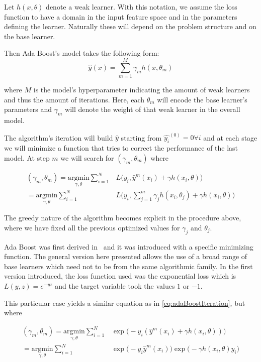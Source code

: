 Let $h(x,\theta)$ denote a weak learner.
With this notation, we assume the loss function to have a domain in the input feature space and in the parameters defining the learner.
Naturally these will depend on the problem structure and on the base learner.

Then Ada Boost's model takes the following form:
\begin{equation}\label{eq:adaBoostModel}
\hat{y}(x) = \sum_{m=1}^{M} \gamma_m h(x,\theta_m)
\end{equation}

where $M$ is the model's hyperparameter indicating the amount of weak learners and thus the amount of iterations.
Here, each $\theta_m$ will encode the base learner's parameters and $\gamma_m$ will denote the weight of that weak learner in the overall model.

The algorithm's iteration will build $\hat{y}$ starting from $\hat{y_i}^{(0)}= 0 \forall i$ and at each stage we will minimize a function that tries to correct the performance of the last model.
At step $m$ we will search for $(\gamma_{m}, \theta_{m})$ where

\begin{equation}\label{eq:adaBoostIteration}
\begin{split}
(\gamma_{m}, \theta_{m}) = \underset{\gamma, \theta}{\mathrm{argmin}} \sum_{i=1}^{N} & L\big( y_i,  \hat{y}^{m}(x_i) + \gamma h(x_i,\theta) \big) \\
= \underset{\gamma, \theta}{\mathrm{argmin}} \sum_{i=1}^{N} & L\big( y_i,  \sum_{j=1}^{m} \gamma_j h(x_i,\theta_j) + \gamma h(x_i,\theta) \big)
\end{split}
\end{equation}

The greedy nature of the algorithm becomes explicit in the procedure above, where we have fixed all the previous optimized values for $\gamma_j$ and $\theta_j$.

Ada Boost was first derived in~\citep{schapire-adaBoost} and it was introduced with a specific minimizing function.
The general version here presented allows the use of a broad range of base learners which need not to be from the same algorithmic family.
In the first version introduced, the loss function used was the exponential loss which is $L(y,z) = e^{-yz}$ and the target variable took the values $1$ or $-1$.

This particular case yields a similar equation as in \cref{eq:adaBoostIteration}, but where

\begin{equation}\label{eq:sadaBoostExponentialIteration}
\begin{split}
(\gamma_{m}, \theta_{m}) = \underset{\gamma, \theta}{\mathrm{argmin}} \sum_{i=1}^{N} & \exp\big( -y_i (\hat{y}^{m}(x_i) + \gamma h(x_i,\theta) )\big) \\
= \underset{\gamma, \theta}{\mathrm{argmin}} \sum_{i=1}^{N} &
\exp\big( -y_i \hat{y}^{m}(x_i)\big) \exp\big(- \gamma h(x_i,\theta)y_i \big)
\end{split}
\end{equation}


